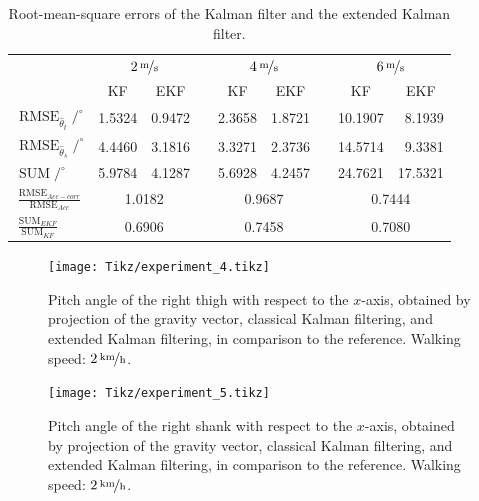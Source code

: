 \begin{table}\centering
{}
\begin{tabular}{@{}lrrcrrcrr@{}}\toprule
& \multicolumn{2}{c}{$\unitfrac[2]{m}{s}$} & \phantom{abc} & \multicolumn{2}{c}{$\unitfrac[4]{m}{s}$} &
\phantom{abc} & \multicolumn{2}{c}{$\unitfrac[6]{m}{s}$}\\ \cmidrule{2-3} \cmidrule{5-6} \cmidrule{8-9}
& \multicolumn{1}{c}{KF} & \multicolumn{1}{c}{EKF} &&  \multicolumn{1}{c}{KF} & \multicolumn{1}{c}{EKF} &&  \multicolumn{1}{c}{KF} & \multicolumn{1}{c}{EKF} \\ \midrule
$\operatorname{RMSE}_{\hat{\theta}_t} / ^{\circ}$ & 1.5324 & 0.9472 && 2.3658 & 1.8721 && 10.1907 & 8.1939 \\
$\operatorname{RMSE}_{\hat{\theta}_s} / ^{\circ}$ & 4.4460 & 3.1816 && 3.3271 & 2.3736 && 14.5714 & 9.3381 \\
$\operatorname{SUM} / ^{\circ}$ & 5.9784 & 4.1287 && 5.6928 & 4.2457 && 24.7621 & 17.5321 \\ \midrule
$\frac{\operatorname{RMSE}_{Acc-corr}}{\operatorname{RMSE}_{Acc}}$ & \multicolumn{2}{c}{1.0182} & \phantom{abc} & \multicolumn{2}{c}{0.9687} & 
\phantom{abc} & \multicolumn{2}{c}{0.7444}\\
$\frac{\operatorname{SUM}_{EKF}}{\operatorname{SUM}_{KF}}$ & \multicolumn{2}{c}{0.6906} & \phantom{abc} & \multicolumn{2}{c}{0.7458} & 
\phantom{abc} & \multicolumn{2}{c}{0.7080}\\
\bottomrule
\end{tabular}
\caption{Root-mean-square errors of the Kalman filter and the extended Kalman filter.}
\label{tab:rmse}
\end{table}

\begin{figure}
	\centering
	\setlength\figureheight{6.8cm} 
	\setlength\figurewidth{\textwidth}
	\texttt{[image: Tikz/experiment\_4.tikz]}
	\caption{Pitch angle of the right thigh with respect to the $x$-axis, obtained by projection of the gravity vector, classical Kalman filtering, and extended Kalman filtering, in comparison to the reference. Walking speed: $\unitfrac[2]{km}{h}$.}
	\label{fig:experiment_4}
\end{figure}

\begin{figure}
	\centering
	\setlength\figureheight{6.8cm} 
	\setlength\figurewidth{\textwidth}
	\texttt{[image: Tikz/experiment\_5.tikz]}
	\caption{Pitch angle of the right shank with respect to the $x$-axis, obtained by projection of the gravity vector, classical Kalman filtering, and extended Kalman filtering, in comparison to the reference. Walking speed: $\unitfrac[2]{km}{h}$.}
	\label{fig:experiment_5}
\end{figure}

